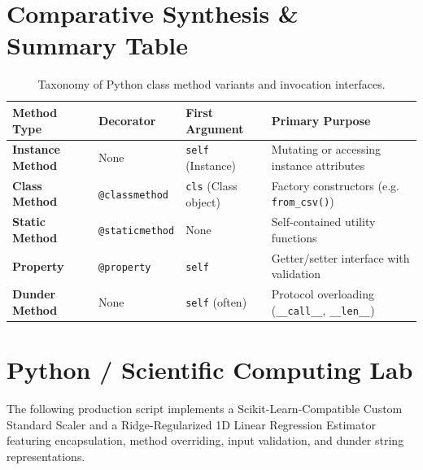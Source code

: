\section{Comparative Synthesis \& Summary Table}

\begin{table}[htbp]
\centering
\small
\begin{tabular}{p{2.6cm} p{2.6cm} p{2.6cm} p{4.2cm}}
\hline
\textbf{Method Type} & \textbf{Decorator} & \textbf{First Argument} & \textbf{Primary Purpose} \\
\hline
\textbf{Instance Method} & None & \texttt{self} (Instance) & Mutating or accessing instance attributes \\
\textbf{Class Method} & \texttt{@classmethod} & \texttt{cls} (Class object) & Factory constructors (e.g. \texttt{from\_csv()}) \\
\textbf{Static Method} & \texttt{@staticmethod} & None & Self-contained utility functions \\
\textbf{Property} & \texttt{@property} & \texttt{self} & Getter/setter interface with validation \\
\textbf{Dunder Method} & None & \texttt{self} (often) & Protocol overloading (\texttt{\_\_call\_\_}, \texttt{\_\_len\_\_}) \\
\hline
\end{tabular}
\caption{Taxonomy of Python class method variants and invocation interfaces.}
\label{tab:oop_methods}
\end{table}

\section{Python / Scientific Computing Lab}

The following production script implements a Scikit-Learn-Compatible Custom Standard Scaler and a Ridge-Regularized 1D Linear Regression Estimator featuring encapsulation, method overriding, input validation, and dunder string representations.


